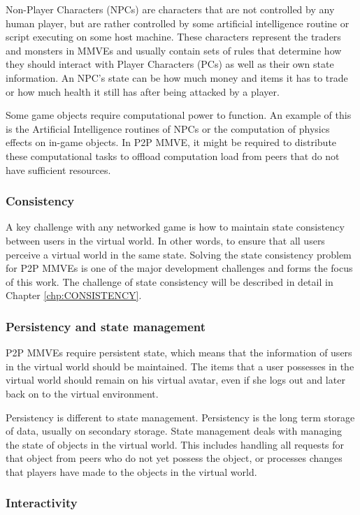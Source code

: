 Non-Player Characters (NPCs) are characters that are not controlled by any human player, but are rather controlled by some artificial intelligence routine or script executing on some host machine. These characters represent the traders and monsters in MMVEs and usually contain sets of rules that determine how they should interact with Player Characters (PCs) as well as their own state information. An NPC's state can be how much money and items it has to trade or how much health it still has after being attacked by a player.

Some game objects require computational power to function. An example of this is the Artificial Intelligence routines of NPCs or the computation of physics effects on in-game objects. In P2P MMVE, it might be required to distribute these computational tasks to offload computation load from peers that do not have sufficient resources.

\subsubsection{Consistency}
A key challenge with any networked game is how to maintain state consistency between users in the virtual world. In other words, to ensure that all users perceive a virtual world in the same state. Solving the state consistency problem for P2P MMVEs is one of the major development challenges and forms the focus of this work. The challenge of state consistency will be described in detail in Chapter \ref{chp:CONSISTENCY}.

\subsubsection{Persistency and state management}

P2P MMVEs require persistent state, which means that the information of users in the virtual world should be maintained. The items that a user possesses in the virtual world should remain on his virtual avatar, even if she logs out and later back on to the virtual environment.

Persistency is different to state management. Persistency is the long term storage of data, usually on secondary storage. State management deals with managing the state of objects in the virtual world. This includes handling all requests for that object from peers who do not yet possess the object, or processes changes that players have made to the objects in the virtual world.

\subsubsection{Interactivity}

